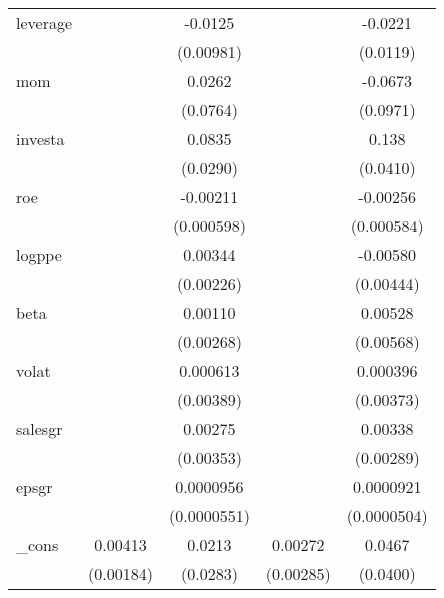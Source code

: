 \begin{table}[htbp]
\begin{tabular}{l*{4}{c}}
leverage        &                  &  -0.0125         &                  &  -0.0221\sym{*}  \\
                &                  &(0.00981)         &                  & (0.0119)         \\
mom             &                  &   0.0262         &                  &  -0.0673         \\
                &                  & (0.0764)         &                  & (0.0971)         \\
investa         &                  &   0.0835\sym{***}&                  &    0.138\sym{***}\\
                &                  & (0.0290)         &                  & (0.0410)         \\
roe             &                  & -0.00211\sym{***}&                  & -0.00256\sym{***}\\
                &                  &(0.000598)         &                  &(0.000584)         \\
logppe          &                  &  0.00344         &                  & -0.00580         \\
                &                  &(0.00226)         &                  &(0.00444)         \\
beta            &                  &  0.00110         &                  &  0.00528         \\
                &                  &(0.00268)         &                  &(0.00568)         \\
volat           &                  & 0.000613         &                  & 0.000396         \\
                &                  &(0.00389)         &                  &(0.00373)         \\
salesgr         &                  &  0.00275         &                  &  0.00338         \\
                &                  &(0.00353)         &                  &(0.00289)         \\
epsgr           &                  &0.0000956\sym{*}  &                  &0.0000921\sym{*}  \\
                &                  &(0.0000551)         &                  &(0.0000504)         \\
\_cons          &  0.00413\sym{**} &   0.0213         &  0.00272         &   0.0467         \\
                &(0.00184)         & (0.0283)         &(0.00285)         & (0.0400)         \\

\end{tabular}
\end{table}

